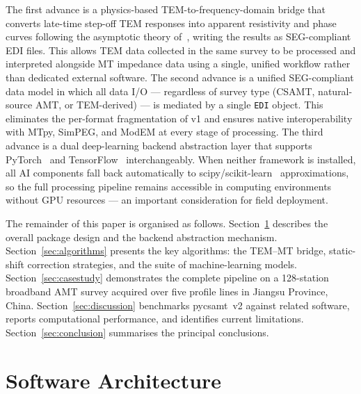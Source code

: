 \documentclass[review,12pt]{elsarticle}
\begin{document}
The first advance is a physics-based TEM-to-frequency-domain bridge that
converts late-time step-off TEM responses into apparent resistivity and
phase curves following the asymptotic theory of~\citet{WardHohmann1988},
writing the results as SEG-compliant EDI files.
This allows TEM data collected in the same survey to be processed and
interpreted alongside MT impedance data using a single, unified workflow
rather than dedicated external software.
The second advance is a unified SEG-compliant data model in which all
data I/O — regardless of survey type (CSAMT, natural-source AMT, or
TEM-derived) — is mediated by a single \texttt{EDI} object.
This eliminates the per-format fragmentation of v1 and ensures native
interoperability with MTpy, SimPEG, and ModEM at every stage of processing.
The third advance is a dual deep-learning backend abstraction layer that
supports PyTorch~\citep{Paszke2019} and TensorFlow~\citep{Abadi2016}
interchangeably.
When neither framework is installed, all AI components fall back
automatically to scipy/scikit-learn~\citep{Pedregosa2011} approximations,
so the full processing pipeline remains accessible in computing environments
without GPU resources — an important consideration for field deployment.

The remainder of this paper is organised as follows.
Section~\ref{sec:architecture} describes the overall package design and the
backend abstraction mechanism.
Section~\ref{sec:algorithms} presents the key algorithms: the TEM–MT
bridge, static-shift correction strategies, and the suite of machine-learning
models.
Section~\ref{sec:casestudy} demonstrates the complete pipeline on a
128-station broadband AMT survey acquired over five profile lines in
Jiangsu Province, China.
Section~\ref{sec:discussion} benchmarks pycsamt~v2 against related software,
reports computational performance, and identifies current limitations.
Section~\ref{sec:conclusion} summarises the principal conclusions.


\section{Software Architecture}
\label{sec:architecture}
\end{document}
